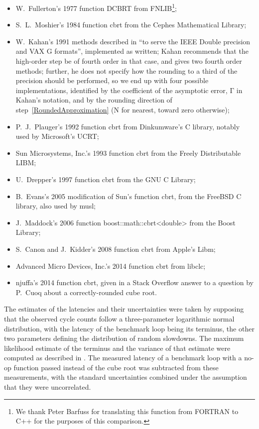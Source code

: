 ﻿\documentclass[10pt, a4paper, twoside]{basestyle}
\begin{document}
\begin{itemize}[nosep]
\item W.~Fullerton's 1977 function DCBRT from FNLIB\footnote{We thank Peter Barfuss for translating this function from FORTRAN to
C++ for the purposes of this comparison.};
\item S.~L.~Moshier's 1984 function cbrt from the Cephes Mathematical Library;
\item W.~Kahan's 1991 methods described in \cite[3]{KahanBindel2001} ``to serve the IEEE Double precision and VAX G formats'',
implemented as written; Kahan recommends that the high-order step be of fourth order in that case, and gives two fourth
order methods; further, he does not specify how the rounding to a third of the precision should be performed,
so we end up with four possible implementations, identified by the coefficient of the asymptotic error,
$\mathrm Γ$ in Kahan's notation, and by the rounding direction of step~\ref{RoundedApproximation}
($\mathrm{N}$ for nearest, toward zero otherwise);
\item  P.~J.~Plauger's 1992 function cbrt from Dinkumware's C library, notably used by Microsoft's UCRT;
\item Sun Microsystems, Inc.'s 1993 function cbrt from the Freely Distributable LIBM;
\item U.~Drepper's 1997 function cbrt from the GNU C Library;
\item B.~Evans's 2005 modification of Sun's function cbrt, from the FreeBSD C library, also used by musl;
\item J.~Maddock's 2006 function boost::math::cbrt<double> from the Boost Library;
\item S.~Canon and J.~Kidder's 2008 function cbrt from Apple's Libm;
\item Advanced Micro Devices, Inc.'s 2014 function cbrt from libclc;
\item njuffa's 2014 function cbrt, given in a Stack Overflow answer to a question by P.~Cuoq about a correctly-rounded cube root.
\end{itemize}
The estimates of the latencies and their uncertainties were taken by supposing that the observed cycle counts follow
a three-parameter logarithmic normal distribution, with the latency of the benchmark loop being its terminus, the other two
parameters defining the distribution of random slowdowns. The maximum likelihood estimate of the terminus and the variance
of that estimate were computed as described in \cite{Cohen1951}.
The measured latency of a benchmark loop with a no-op function passed instead of the cube root was subtracted from these measurements,
with the standard uncertainties combined under the assumption that they were uncorrelated.
\end{document}
